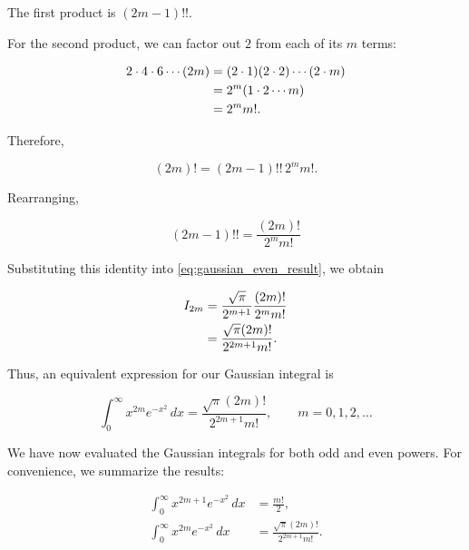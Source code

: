 \documentclass[11pt,a4paper]{article}
\theoremstyle{definition}
\theoremstyle{remark}
\begin{document}
The first product is
$(2m-1)!!$.

For the second product,
we can factor out $2$
from each of its $m$ terms:

\begin{align}
    2\cdot4\cdot6\cdots(2m)
    &=
    (2\cdot1)(2\cdot2)
    \cdots(2\cdot m)
    \notag\\
    &=
    2^m(1\cdot2\cdots m)
    \notag\\
    &=
    2^m m!.
\end{align}

Therefore,

\[
    (2m)!
    =
    (2m-1)!!\,2^m m!.
\]

Rearranging,

\begin{equation}
    \boxed{
    (2m-1)!!
    =
    \frac{(2m)!}{2^m m!}
    }
    \label{eq:double_factorial_identity}
\end{equation}

Substituting this identity into
\eqref{eq:gaussian_even_result},
we obtain

\begin{align}
    I_{2m}
    &=
    \frac{\sqrt{\pi}}{2^{m+1}}
    \frac{(2m)!}{2^m m!}
    \notag\\
    &=
    \frac{\sqrt{\pi}(2m)!}
         {2^{2m+1}m!}.
\end{align}

Thus, an equivalent expression
for our Gaussian integral is

\begin{equation}
    \boxed{
    \int_0^\infty
    x^{2m}e^{-x^2}\,dx
    =
    \frac{\sqrt{\pi}(2m)!}
         {2^{2m+1}m!},
    \qquad m=0,1,2,\ldots
    }
    \label{eq:gaussian_even_factorial_result}
\end{equation}

\medskip

We have now evaluated the Gaussian
integrals for both odd and even powers.
For convenience, we summarize the
results:

\begin{equation}
\boxed{
\begin{aligned}
    \int_0^\infty
    x^{2m+1}e^{-x^2}\,dx
    &=
    \frac{m!}{2},\\[6pt]
    \int_0^\infty
    x^{2m}e^{-x^2}\,dx
    &=
    \frac{\sqrt{\pi}(2m)!}
         {2^{2m+1}m!}.
\end{aligned}
}
\label{eq:gaussian_summary}
\end{equation}
\end{document}
